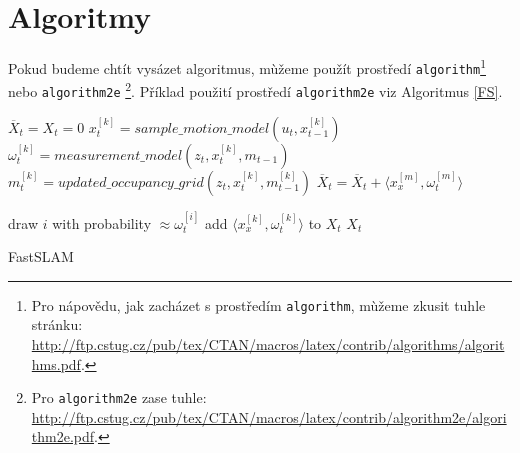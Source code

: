 \documentclass[11pt,a4paper]{article}
\begin{document}
\section{Algoritmy}
\label{sec:algo}
Pokud budeme chtít vysázet algoritmus, mùžeme použít prostředí \texttt{algorithm}\footnote{Pro nápovědu, jak zacházet s prostředím \texttt{algorithm}, mùžeme zkusit tuhle stránku:\\
\url{http://ftp.cstug.cz/pub/tex/CTAN/macros/latex/contrib/algorithms/algorithms.pdf}.} nebo \texttt{algorithm2e}
\footnote{Pro \texttt{algorithm2e} zase tuhle:\\
\url{http://ftp.cstug.cz/pub/tex/CTAN/macros/latex/contrib/algorithm2e/algorithm2e.pdf}.}.
Příklad použití prostředí \texttt{algorithm2e} viz Algoritmus \ref{FS}.

\begin{algorithm}
\DontPrintSemicolon
\SetAlgoNoLine
\SetNlSty{}{}{:}
$\overline X_t = X_t = 0$\;
 {
    $x_t^{[k]} = sample\_motion\_model(u_t, x_{t-1}^{[k]}) $\;
    $\omega_t^{[k]} = measurement\_model(z_t, x_t^{[k]}, m_{t-1}) $\;
    $m_t^{[k]} = updated\_occupancy\_grid(z_t, x_t^{[k]}, m_{t-1}^{[k]}) $\;
    $\overline X_t = \overline X_t + \langle x_x^{[m]}, \omega_t^{[m]}\rangle $\;
}

{
    \textup{draw} $i$ \textup{with probability} $\approx \omega_t^{[i]}$\;
    \textup{add} $\langle x_x^{[k]}, \omega_t^{[k]}\rangle$ \textup{to} $X_t$\;
}
\Return $X_t$
\caption{FastSLAM\label{FS}}
\end{algorithm}
\end{document}
